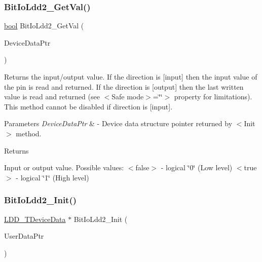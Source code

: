 \subsubsection{\texorpdfstring{Bit\+Io\+Ldd2\+\_\+\+Get\+Val()}{BitIoLdd2\_GetVal()}}
{\footnotesize\ttfamily \hyperlink{group___p_e___types__module_ga97a80ca1602ebf2303258971a2c938e2}{bool} Bit\+Io\+Ldd2\+\_\+\+Get\+Val (\begin{DoxyParamCaption}\item[{\hyperlink{group___p_e___types__module_gac5cf1362f1f0e3a2ce71b1bf2276d091}{L\+D\+D\+\_\+\+T\+Device\+Data} $\ast$}]{Device\+Data\+Ptr }\end{DoxyParamCaption})}



Returns the input/output value. If the direction is \mbox{[}input\mbox{]} then the input value of the pin is read and returned. If the direction is \mbox{[}output\mbox{]} then the last written value is read and returned (see $<$\+Safe mode$>$=\char`\"{}\char`\"{}$>$ property for limitations). This method cannot be disabled if direction is \mbox{[}input\mbox{]}. 


\begin{DoxyParams}{Parameters}
{\em Device\+Data\+Ptr} & -\/ Device data structure pointer returned by $<$\+Init$>$ method. \\
\hline
\end{DoxyParams}
\begin{DoxyReturn}{Returns}

\begin{DoxyItemize}
\item Input or output value. Possible values\+: $<$false$>$ -\/ logical \char`\"{}0\char`\"{} (Low level) $<$true$>$ -\/ logical \char`\"{}1\char`\"{} (High level) 
\end{DoxyItemize}
\end{DoxyReturn}
\mbox{\label{group___bit_io_ldd2__module_ga553dbb392db7bc92230a019512a1e5ab}} 
\subsubsection{\texorpdfstring{Bit\+Io\+Ldd2\+\_\+\+Init()}{BitIoLdd2\_Init()}}
{\footnotesize\ttfamily \hyperlink{group___p_e___types__module_gac5cf1362f1f0e3a2ce71b1bf2276d091}{L\+D\+D\+\_\+\+T\+Device\+Data} $\ast$ Bit\+Io\+Ldd2\+\_\+\+Init (\begin{DoxyParamCaption}\item[{\hyperlink{group___p_e___types__module_ga0b66a73f87238a782318aa0be7578e35}{L\+D\+D\+\_\+\+T\+User\+Data} $\ast$}]{User\+Data\+Ptr }\end{DoxyParamCaption})}



